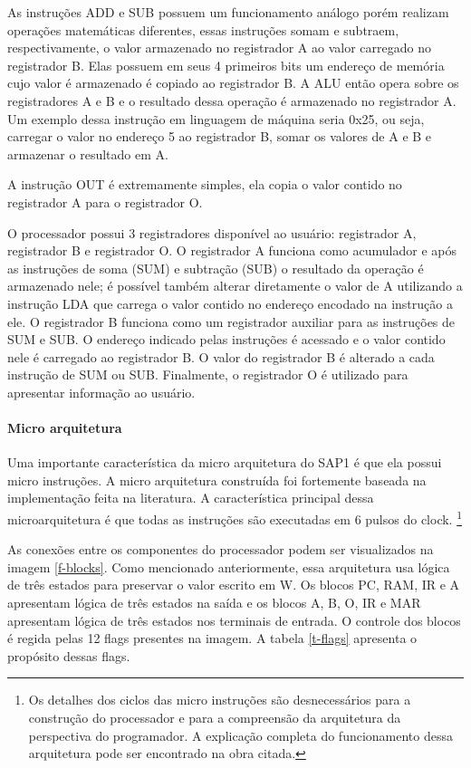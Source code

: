 As instruções ADD e SUB possuem um funcionamento análogo porém realizam operações matemáticas diferentes, essas instruções somam e subtraem, respectivamente, o valor armazenado no registrador A ao valor carregado no registrador B.
Elas possuem em seus 4 primeiros bits um endereço de memória cujo valor é armazenado é copiado ao registrador B.
A ALU então opera sobre os registradores A e B e o resultado dessa operação é armazenado no registrador A.
Um exemplo dessa instrução em linguagem de máquina seria 0x25, ou seja, carregar o valor no endereço 5 ao registrador B, somar os valores de A e B e armazenar o resultado em A. 

A instrução OUT é extremamente simples, ela copia o valor contido no registrador A para o registrador O.

O processador possui 3 registradores disponível ao usuário: registrador A, registrador B e registrador O.
O registrador A funciona como acumulador e após as instruções de soma (SUM) e subtração (SUB) o resultado da operação é armazenado nele; é possível também alterar diretamente o valor de A utilizando a instrução LDA que carrega o valor contido no endereço encodado na instrução a ele.
O registrador B funciona como um registrador auxiliar para as instruções de SUM e SUB.
O endereço indicado pelas instruções é acessado e o valor contido nele é carregado ao registrador B.
O valor do registrador B é alterado a cada instrução de SUM ou SUB.
Finalmente, o registrador O é utilizado para apresentar informação ao usuário.

\paragraph{Micro arquitetura}
Uma importante característica da micro arquitetura do SAP1 é que ela possui micro instruções.
A micro arquitetura construída foi fortemente baseada na implementação feita na literatura.
A característica principal dessa microarquitetura é que todas as instruções são executadas em 6 pulsos do clock.
\footnote{Os detalhes dos ciclos das micro instruções são desnecessários para a construção do processador e para a compreensão da arquitetura da perspectiva do programador. A explicação completa do funcionamento dessa arquitetura pode ser encontrado na obra citada.}

As conexões entre os componentes do processador podem ser visualizados na imagem \ref{f-blocks}.
Como mencionado anteriormente, essa arquitetura usa lógica de três estados para preservar o valor escrito em W.
Os blocos PC, RAM, IR e A apresentam lógica de três estados na saída e os blocos A, B, O, IR e MAR apresentam lógica de três estados nos terminais de entrada.
O controle dos blocos é regida pelas 12 flags presentes na imagem.
A tabela \ref{t-flags} apresenta o propósito dessas flags. 


